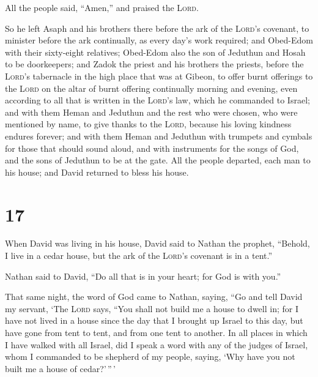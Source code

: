 All the people said, ``Amen,'' and praised the \textsc{Lord}.

 So he left Asaph and his brothers there before the ark
of the \textsc{Lord}'s covenant, to minister before the ark continually,
as every day's work required;  and Obed-Edom with their
sixty-eight relatives; Obed-Edom also the son of Jeduthun and Hosah to
be doorkeepers;  and Zadok the priest and his brothers
the priests, before the \textsc{Lord}'s tabernacle in the high place
that was at Gibeon,  to offer burnt offerings to the
\textsc{Lord} on the altar of burnt offering continually morning and
evening, even according to all that is written in the \textsc{Lord}'s
law, which he commanded to Israel;  and with them Heman
and Jeduthun and the rest who were chosen, who were mentioned by name,
to give thanks to the \textsc{Lord}, because his loving kindness endures
forever;  and with them Heman and Jeduthun with trumpets
and cymbals for those that should sound aloud, and with instruments for
the songs of God, and the sons of Jeduthun to be at the gate.
 All the people departed, each man to his house; and
David returned to bless his house.

\hypertarget{section-16}{%
\section{17}\label{section-16}}

 When David was living in his house, David said to Nathan
the prophet, ``Behold, I live in a cedar house, but the ark of the
\textsc{Lord}'s covenant is in a tent.''

 Nathan said to David, ``Do all that is in your heart; for
God is with you.''

 That same night, the word of God came to Nathan, saying,
 ``Go and tell David my servant, `The \textsc{Lord} says,
``You shall not build me a house to dwell in;  for I have
not lived in a house since the day that I brought up Israel to this day,
but have gone from tent to tent, and from one tent to another.
 In all places in which I have walked with all Israel, did
I speak a word with any of the judges of Israel, whom I commanded to be
shepherd of my people, saying, `Why have you not built me a house of
cedar?'\,''\,'

